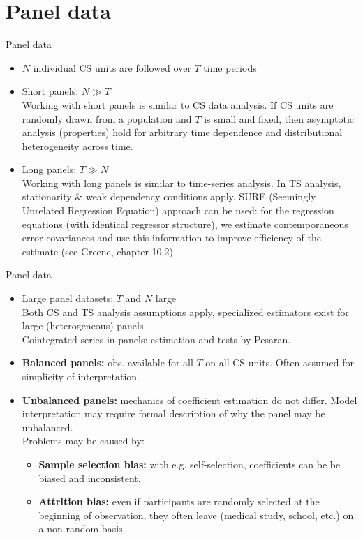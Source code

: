 \documentclass[usenames,dvipsnames]{beamer}
\begin{document}
\section{Panel data}
\begin{frame}{Panel data}
\begin{itemize}
\item $N$ individual CS units are followed over $T$ time periods
\medskip
\item Short panels: $N \gg T$ \\
Working with short panels is similar to CS data analysis. If CS units are randomly drawn from a population and $T$ is small and fixed, then asymptotic analysis (properties) hold for arbitrary time dependence and distributional heterogeneity across time.
\medskip
\item Long panels: $T \gg N$ \\
Working with long panels is similar to time-series analysis. In TS analysis, stationarity \& weak dependency conditions apply. SURE (Seemingly Unrelated Regression Equation) approach can be used: for the regression equations (with identical regressor structure), we estimate contemporaneous error covariances and use this information to improve efficiency of the estimate (see Greene, chapter 10.2)
\end{itemize}
\end{frame}
\begin{frame}{Panel data}
\begin{itemize}
\item Large panel datasets: $T$ and $N$ large\\
Both CS and TS analysis assumptions apply, specialized estimators exist for large (heterogeneous) panels.\\Cointegrated series in panels: estimation and tests by Pesaran.
\bigskip
\item \textbf{Balanced panels:} obs. available for all $T$ on all CS units. Often assumed for simplicity of interpretation.
\smallskip
\item \textbf{Unbalanced panels:} mechanics of coefficient estimation do not differ. Model interpretation may require formal description of why the panel may be unbalanced. \\Problems may be caused by: 
\begin{itemize}
    \item \textbf{Sample selection bias:} with e.g. self-selection, coefficients can be be biased and inconsistent.
    \item \textbf{Attrition bias:} even if participants are randomly selected  at the beginning of observation, they often leave (medical study, school, etc.) on a non-random basis.   
\end{itemize}
\end{itemize}
\end{frame}
\end{document}
